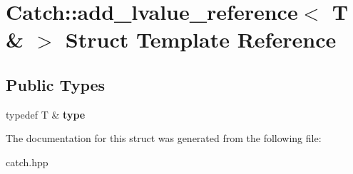\hypertarget{structCatch_1_1add__lvalue__reference_3_01T_01_6_01_4}{}\section{Catch\+:\+:add\+\_\+lvalue\+\_\+reference$<$ T \& $>$ Struct Template Reference}
\label{structCatch_1_1add__lvalue__reference_3_01T_01_6_01_4}
\subsection*{Public Types}
\begin{DoxyCompactItemize}
\item 
\mbox{\label{structCatch_1_1add__lvalue__reference_3_01T_01_6_01_4_ae410743009a52c98fbb27f1b6fc7a886}} 
typedef T \& {\bfseries type}
\end{DoxyCompactItemize}


The documentation for this struct was generated from the following file\+:\begin{DoxyCompactItemize}
\item 
catch.\+hpp\end{DoxyCompactItemize}
